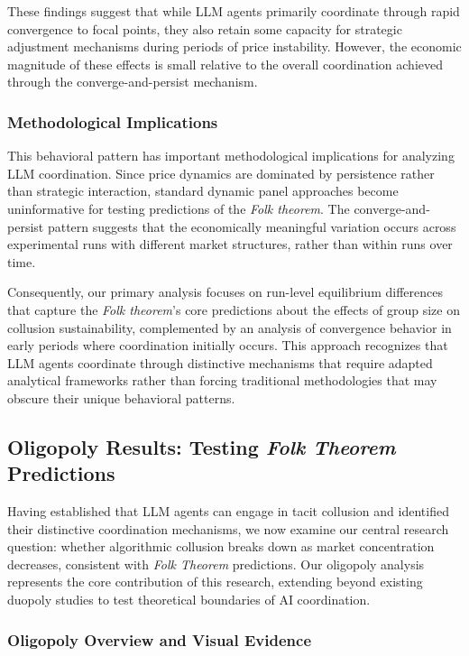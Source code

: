 These findings suggest that while LLM agents primarily coordinate through rapid convergence to focal points, they also retain some capacity for strategic adjustment mechanisms during periods of price instability. However, the economic magnitude of these effects is small relative to the overall coordination achieved through the converge-and-persist mechanism.

\subsubsection*{Methodological Implications}

This behavioral pattern has important methodological implications for analyzing LLM coordination. Since price dynamics are dominated by persistence rather than strategic interaction, standard dynamic panel approaches become uninformative for testing predictions of the \emph{Folk theorem}. The converge-and-persist pattern suggests that the economically meaningful variation occurs across experimental runs with different market structures, rather than within runs over time.

Consequently, our primary analysis focuses on run-level equilibrium differences that capture the \emph{Folk theorem}'s core predictions about the effects of group size on collusion sustainability, complemented by an analysis of convergence behavior in early periods where coordination initially occurs. This approach recognizes that LLM agents coordinate through distinctive mechanisms that require adapted analytical frameworks rather than forcing traditional methodologies that may obscure their unique behavioral patterns.

\subsection{Oligopoly Results: Testing \emph{Folk Theorem} Predictions}

Having established that LLM agents can engage in tacit collusion and identified their distinctive coordination mechanisms, we now examine our central research question: whether algorithmic collusion breaks down as market concentration decreases, consistent with \emph{Folk Theorem} predictions. Our oligopoly analysis represents the core contribution of this research, extending beyond existing duopoly studies to test theoretical boundaries of AI coordination.

\subsubsection*{Oligopoly Overview and Visual Evidence}

